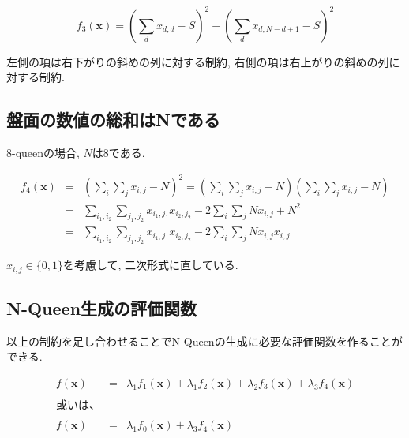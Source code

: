 \documentclass[uplatex,dvipdfmx,a4paper,11pt,oneside,openany]{jsbook}
\begin{document}
\[
f_3(\bm{x}) = \left(\sum_d x_{d,d} - S \right)^2 + \left(\sum_d x_{d,N-d+1} - S \right)^2
\]

左側の項は右下がりの斜めの列に対する制約, 右側の項は右上がりの斜めの列に対する制約.

\subsection{盤面の数値の総和はNである}

8-queenの場合, $N$は$8$である.

\begin{eqnarray*}
f_4(\bm{x})&=&\left(\sum_i\sum_j x_{i,j} - N\right)^2=\left(\sum_i\sum_j x_{i,j} - N\right)\left(\sum_i\sum_j x_{i,j} - N\right)\\
&=&\sum_{i_1,i_2}\sum_{j_1,j_2}x_{i_1,j_1}x_{i_2,j_2}-2\sum_i\sum_j N x_{i,j} + N^2\\
&=&\sum_{i_1,i_2}\sum_{j_1,j_2}x_{i_1,j_1}x_{i_2,j_2} -2\sum_i\sum_j N x_{i,j}x_{i,j}
\end{eqnarray*}

$x_{i,j}\in \{0,1\}$を考慮して, 二次形式に直している.





\subsection{N-Queen生成の評価関数}

以上の制約を足し合わせることでN-Queenの生成に必要な評価関数を作ることができる.

\begin{eqnarray*}
  f(\bm{x}) &=& \lambda_1 f_1(\bm{x}) + \lambda_1 f_2(\bm{x}) + \lambda_2 f_3(\bm{x}) + \lambda_3 f_4(\bm{x})\\
  \\或いは、\\\\
  f(\bm{x}) &=& \lambda_1 f_0(\bm{x}) + \lambda_3 f_4(\bm{x})
\end{eqnarray*}
\end{document}
